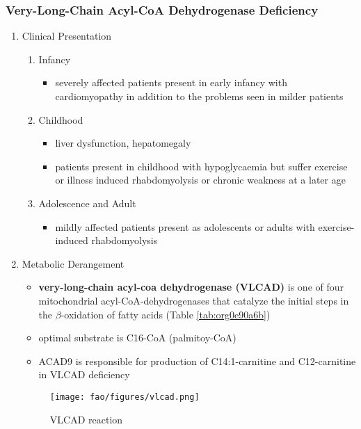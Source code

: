 \documentclass[12pt]{scrartcl}
\begin{document}
\subsubsection{Very-Long-Chain Acyl-CoA Dehydrogenase Deficiency}
\label{sec:orgff48ca6}
\begin{enumerate}
\item Clinical Presentation
\label{sec:orgd0abfd6}
\begin{enumerate}
\item Infancy
\label{sec:orgf9e718e}
\begin{itemize}
\item severely affected patients present in early infancy with
cardiomyopathy in addition to the problems seen in milder patients
\end{itemize}
\item Childhood
\label{sec:org08b1f4a}
\begin{itemize}
\item liver dysfunction, hepatomegaly
\item patients present in childhood with hypoglycaemia but suffer exercise
or illness induced rhabdomyolysis or chronic weakness at a later age
\end{itemize}
\item Adolescence and Adult
\label{sec:org34c6a3b}
\begin{itemize}
\item mildly affected patients present as adolescents or adults with
exercise-induced rhabdomyolysis
\end{itemize}
\end{enumerate}
\item Metabolic Derangement
\label{sec:org8d3bc51}
\begin{itemize}
\item \textbf{very-long-chain acyl-coa dehydrogenase (VLCAD)} is one of four
mitochondrial acyl-CoA-dehydrogenases that catalyze the initial
steps in the \(\beta\)-oxidation of fatty acids (Table \ref{tab:org0e90a6b})
\item optimal substrate is C16-CoA (palmitoy-CoA)
\item ACAD9 is responsible for production of C14:1-carnitine and
C12-carnitine in VLCAD deficiency
\end{itemize}

\begin{figure}[htbp]
\centering
\texttt{[image: fao/figures/vlcad.png]}
\caption{\label{fig:orgf02d9a6}VLCAD reaction}
\end{figure}


\end{enumerate}
\end{document}
